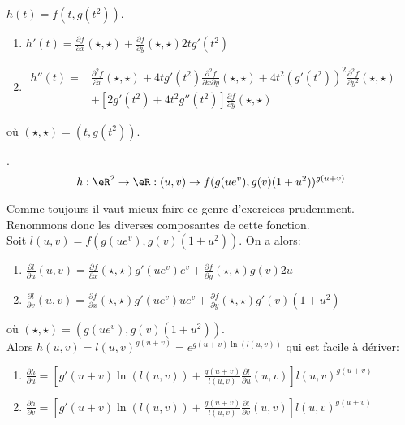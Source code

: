 \noindent $h(t)=f(t,g(t^2))$.\\

\begin{enumerate}
    \item $h'(t)=\frac{ \partial f }{ \partial x }(\star,\star)+\frac{ \partial f }{ \partial y }(\star,\star)2tg'(t^2)$
    \item $ \begin{array}{rl} h''(t)=     &   \frac{ \partial^2f }{ \partial x }(\star,\star)+4tg'(t^2)\frac{ \partial^2f }{ \partial x\partial y }(\star,\star)+4t^2(g'(t^2))^2\frac{ \partial^2f }{ \partial y^2 }(\star,\star) \\
        & +[2g'(t^2)+4t^2g''(t^2)]\frac{ \partial f }{ \partial y }(\star,\star)\end{array}$

\end{enumerate}
où $(\star,\star) = (t,g(t^2))$.

\vspace{1cm}

.
\[h:\eR^2\rightarrow \eR:(u,v)\rightarrow  f(g(ue^v),g(v)(1+u^2))^{g(u+v)}\]

\noindent Comme toujours il vaut mieux faire ce genre d'exercices prudemment. Renommons donc les diverses composantes de cette fonction.\\

\noindent Soit $l(u,v)=f(g(ue^v),g(v)(1+u^2))$. On a alors:
\begin{enumerate}
    \item $\frac{ \partial l }{ \partial u }(u,v) = \frac{ \partial f }{ \partial x }(\star,\star)g'(ue^v)e^v + \frac{ \partial f }{ \partial y }(\star,\star)g(v)2u$
    \item $\frac{ \partial l }{ \partial v }(u,v) = \frac{ \partial f }{ \partial x }(\star,\star)g'(ue^v)ue^v+\frac{ \partial f }{ \partial y }(\star,\star)g'(v)(1+u^2)$
\end{enumerate}
o\`{u} $(\star,\star)=(g(ue^v),g(v)(1+u^2))$.\\

\noindent Alors $h(u,v)=l(u,v)^{g(u+v)} = e^{g(u+v)\ln(l(u,v))}$ qui est facile à dériver:

\begin{enumerate}
    \item $\frac{ \partial h }{ \partial u } = [g'(u+v)\ln(l(u,v))+\frac{g(u+v)}{l(u,v)}\frac{ \partial l }{ \partial u }(u,v)] l(u,v)^{g(u+v)}$
    \item $\frac{ \partial h }{ \partial v } = [g'(u+v)\ln(l(u,v))+\frac{g(u+v)}{l(u,v)}\frac{ \partial l }{ \partial v }(u,v)] l(u,v)^{g(u+v)}$
\end{enumerate}



